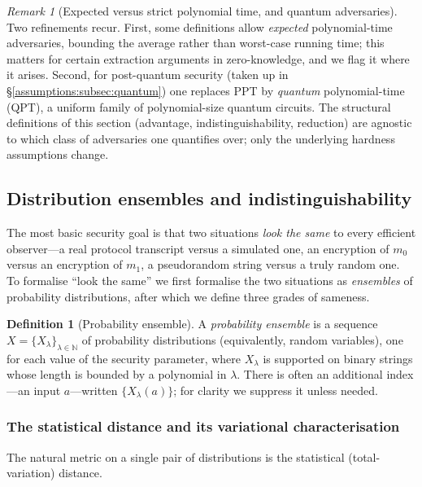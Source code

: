 \documentclass[11pt,a4paper]{article}
\theoremstyle{definition}
\newtheorem{definition}[theorem]{Definition}
\theoremstyle{remark}
\newtheorem{remark}[theorem]{Remark}
\newcommand{\N}{\ensuremath{\mathbb{N}}}
\begin{document}
\begin{remark}[Expected versus strict polynomial time, and quantum adversaries]\label{model:rem:variants}
Two refinements recur. First, some definitions allow \emph{expected}
polynomial-time adversaries, bounding the average rather than worst-case running
time; this matters for certain extraction arguments in zero-knowledge, and we flag
it where it arises. Second, for post-quantum security (taken up in
\S\ref{assumptions:subsec:quantum}) one replaces PPT by \emph{quantum}
polynomial-time (QPT), a
uniform family of polynomial-size quantum circuits. The structural definitions of
this section (advantage, indistinguishability, reduction) are agnostic to which
class of adversaries one quantifies over; only the underlying hardness assumptions
change.
\end{remark}

\subsection{Distribution ensembles and indistinguishability}\label{model:subsec:indist}

The most basic security goal is that two situations \emph{look the same} to every
efficient observer---a real protocol transcript versus a simulated one, an
encryption of \(m_0\) versus an encryption of \(m_1\), a pseudorandom string
versus a truly random one. To formalise ``look the same'' we first formalise the
two situations as \emph{ensembles} of probability distributions, after which
we define three grades of sameness.

\begin{definition}[Probability ensemble]\label{model:def:ensemble}
A \emph{probability ensemble} is a sequence \(X = \{X_\lambda\}_{\lambda\in\N}\)
of probability distributions (equivalently, random variables), one for each value
of the security parameter, where \(X_\lambda\) is supported on binary strings
whose length is bounded by a polynomial in \(\lambda\). There is often an
additional index---an input \(a\)---written \(\{X_\lambda(a)\}\); for clarity we
suppress it unless needed.
\end{definition}

\subsubsection{The statistical distance and its variational characterisation}

The natural metric on a single pair of distributions is the statistical
(total-variation) distance.
\end{document}
